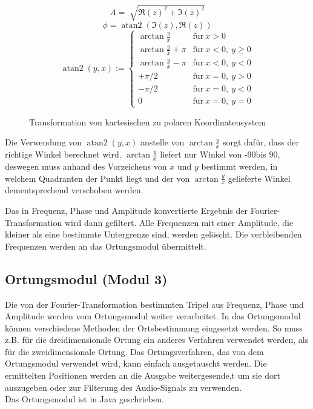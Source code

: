   \begin{minipage}{0.49\textwidth}
  $$
  A = \sqrt[]{{\Re(z)}^2 + {\Im(z)}^2}
  $$
  $$
  \phi = \operatorname{atan2}(\Im(z), \Re(z))
  $$
  $$
  \operatorname{atan2}(y,x) := \begin{cases} \arctan\frac{y}{x} & \mathrm{f\ddot ur}\ x > 0\\ \arctan\frac{y}{x} + \pi & \mathrm{f\ddot ur}\ x < 0,\ y \geq 0\\ \arctan\frac{y}{x} - \pi & \mathrm{f\ddot ur}\ x < 0,\ y < 0\\ +\pi/2 & \mathrm{f\ddot ur}\ x = 0,\ y > 0\\ -\pi/2 & \mathrm{f\ddot ur}\ x = 0,\ y < 0\\ 0 & \mathrm{f\ddot ur}\ x = 0,\ y = 0 \end{cases}
  $$
  \end{minipage}\hfill%
  \begin{minipage}{0.49\textwidth}
  \begin{figure}[H]
  \centering
  \scalebox{.6}{}
  \caption{Transformation von kartesischen zu polaren Koordinatensystem}
  \label{fig:polarconvert}
  \end{figure}
  \end{minipage}%
  \vspace*{5pt}
  Die Verwendung von $\operatorname{atan2}(y,x)$ anstelle von $\arctan\frac{y}{x}$ sorgt dafür, dass der richtige Winkel berechnet wird. $\arctan\frac{y}{x}$ liefert nur Winkel von -90\degree bis 90\degree, deswegen muss anhand des Vorzeichens von $x$ und $y$ bestimmt werden, in welchem Quadranten der Punkt liegt und der von $\arctan\frac{y}{x}$ gelieferte Winkel dementsprechend verschoben werden.

  Das in Frequenz, Phase und Amplitude konvertierte Ergebnis der Fourier-Transformation wird dann gefiltert. Alle Frequenzen mit einer Amplitude, die kleiner als eine bestimmte Untergrenze sind, werden gelöscht. Die verbleibenden Frequenzen werden an das Ortungsmodul übermittelt.

  \subsection{Ortungsmodul (Modul 3)}
  Die von der Fourier-Transformation bestimmten Tripel aus Frequenz, Phase und Amplitude werden vom Ortungsmodul weiter verarbeitet. In das Ortungsmodul können verschiedene Methoden der Ortsbestimmung eingesetzt werden. So muss z.B. für die dreidimensionale Ortung ein anderes Verfahren verwendet werden, als für die zweidimensionale Ortung. Das Ortungsverfahren, das von dem Ortungsmodul verwendet wird, kann einfach ausgetauscht werden. Die ermittelten Positionen werden an die Ausgabe weitergesende,t um sie dort auszugeben oder zur Filterung des Audio-Signals zu verwenden. \\
  Das Ortungsmodul ist in Java geschrieben. 
